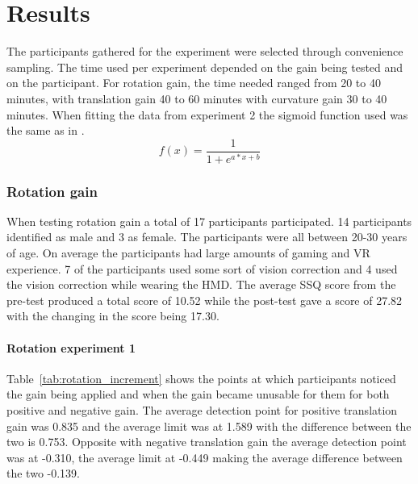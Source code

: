 \chapter{Results}
\label{chap:results}

The participants gathered for the experiment were selected through convenience sampling. The time used per experiment depended on the gain being tested and on the participant. For rotation gain, the time needed ranged from 20 to 40 minutes, with translation gain 40 to 60 minutes with curvature gain 30 to 40 minutes. When fitting the data from experiment 2 the sigmoid function used was the same as in \cite{steinicke2010estimation}.
\[ f(x) = \frac{1}{1 + e^{a*x+b}} \]

\subsection{Rotation gain}
When testing rotation gain a total of 17 participants participated. 14 participants identified as male and 3 as female. The participants were all between 20-30 years of age. On average the participants had large amounts of gaming and VR experience. 7 of the participants used some sort of vision correction and 4 used the vision correction while wearing the HMD. The average SSQ score from the pre-test produced a total score of 10.52 while the post-test gave a score of 27.82 with the changing in the score being 17.30.

\subsubsection{Rotation experiment 1}
Table~\ref{tab:rotation_increment} shows the points at which participants noticed the gain being applied and when the gain became unusable for them for both positive and negative gain. The average detection point for positive translation gain was 0.835 and the average limit was at 1.589 with the difference between the two is 0.753. Opposite with negative translation gain the average detection point was at -0.310, the average limit at -0.449 making the average difference between the two -0.139.

